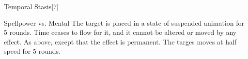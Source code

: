 \begin{spellsection}{Temporal Stasis}[7]
    \begin{spellheader}
    \end{spellheader}
    \begin{spellcontent}
        \begin{spelltargetinginfo}
        \end{spelltargetinginfo}
        \begin{spelleffects}
            \begin{spellattack}{Spellpower vs. Mental}
                \spellsuccess The target is placed in a state of suspended animation for 5 rounds. Time ceases to flow for it, and it cannot be altered or moved by any effect.
                \spellcritical As above, except that the effect is permanent.
                \spellfailure The targes moves at half speed for 5 rounds.
            \end{spellattack}
        \end{spelleffects}
    \end{spellcontent}
    \begin{spellfooter}
        \miscastrandom
    \end{spellfooter}
\end{spellsection}


